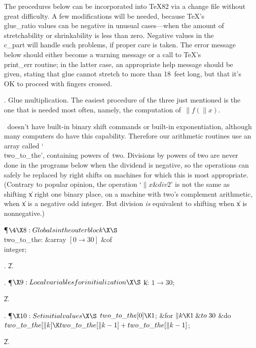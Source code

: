 The procedures below can be incorporated into \TeX82 via a change file
without great difficulty. A few modifications will be needed, because
\TeX's \\{glue\_ratio} values can be negative in unusual cases---when the
amount of stretchability or shrinkability is less than zero. Negative
values in the \\{c\_part} will handle such problems, if proper care is
taken.  The error message below should either become a warning message
or a call to \TeX's \\{print\_err} routine; in the latter case, an
appropriate help message should be given, stating that glue cannot
stretch to more than 18~feet long, but that it's OK to proceed with
fingers crossed.

\fi

. Glue multiplication.
The easiest procedure of the three just mentioned is the one that is
needed most often, namely, the computation of~$\|f(\|x)$.

\PASCAL\ doesn't have built-in binary shift commands or built-in
exponentiation,
although many computers do have this capability. Therefore our arithmetic
routines use an array called `\\{two\_to\_the}', containing powers of~two.
Divisions by powers of two are never done in the programs below when the
dividend is negative, so the operations can safely be replaced by right
shifts on machines for which this is most appropriate. (Contrary to popular
opinion, the operation `$\|x\mathbin{\&{div}}2$' is not the same as shifting %
\|x
right one binary place, on a machine with two's complement arithmetic,
when \|x is a negative odd integer. But division
{\it is\/} equivalent to shifting when \|x is nonnegative.)

\Y\P$\4\X8:Globals in the outer block\X\S$\6
\4\\{two\_to\_the}: \&{array} $[0\to30]$ \1\&{of}\5
\\{integer};\2\par
{}.
\U2.\fi

. \P$\X9:Local variables for initialization\X\S$\6
\4\|k: $1\to30$;\par
\U2.\fi

. \P$\X10:Set initial values\X\S$\6
$\\{two\_to\_the}[0]\K1$;\6
\&{for} $\|k\K1\mathrel{\&{to}}30$ \1\&{do}\5
$\\{two\_to\_the}[\|k]\K\\{two\_to\_the}[\|k-1]+\\{two\_to\_the}[\|k-1]$;\2\par
\U2.\fi


